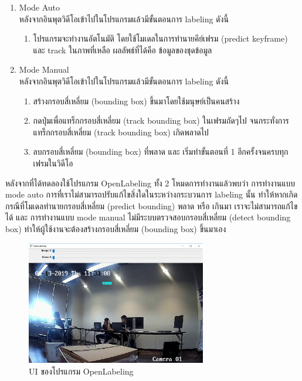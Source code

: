 \begin{enumerate}
	\setlength\itemsep{-0.25em}
	\item Mode Auto
	\\ หลังจากอินพุตวิดีโอเข้าไปในโปรแกรมแล้วมีขั้นตอนการ labeling ดังนี้ 
   	\begin{enumerate}
	\setlength\itemsep{-0.25em}
    		\item โปรแกรมจะทำงานอัตโนมัติ โดยใช้โมเดลในการทำนายคีย์เฟรม (predict keyframe)  และ track ในภาพที่เหลือ ผลลัพธ์ที่ได้คือ ข้อมูลของชุดข้อมูล
 	\end{enumerate}
	\item Mode Manual
	\\ หลังจากอินพุตวิดีโอเข้าไปในโปรแกรมแล้วมีขั้นตอนการ labeling ดังนี้ 
	\begin{enumerate}
	\setlength\itemsep{-0.25em}
    		\item สร้างกรอบสี่เหลี่ยม (bounding box) ขึ้นมาโดยใช้มนุษย์เป็นคนสร้าง
		\item กดปุ่มเพื่อแทร็กกรอบสี่เหลี่ยม (track bounding box) ในเฟรมถัดๆไป จนกระทั่งการแทร็กกรอบสี่เหลี่ยม (track bounding box) เกิดพลาดไป
		\item ลบกรอบสี่เหลี่ยม (bounding box) ที่พลาด และ เริ่มทำขั้นตอนที่ 1 อีกครั้งจนครบทุกเฟรมในวิดีโอ
 	\end{enumerate}
 \end{enumerate}
หลังจากที่ได้ทดลองใช้โปรแกรม OpenLabeling ทั้ง 2 โหมดการทำงานแล้วพบว่า การทำงานแบบ mode auto การที่เราไม่สามารถปรับแก้ไขสิ่งใดในระหว่างกระบวนการ labeling นั้น ทำให้หากเกิดกรณีที่โมเดลทำนายกรอบสี่เหลี่ยม (predict bounding) พลาด หรือ เกินมา เราจะไม่สามารถแก้ไขได้ และ การทำงานแบบ mode manual ไม่มีระบบตรวจสอบกรอบสี่เหลี่ยม (detect bounding box) ทำให้ผู้ใช้งานจะต้องสร้างกรอบสี่เหลี่ยม (bounding box) ขึ้นมาเอง

\begin{figure}[!ht]
	\centering
	\includegraphics[width=0.7\textwidth]{chapter2/images/openlabel.png}
		\caption{UI ของโปรแกรม OpenLabeling}
    	\label{fig:openlabel}
\end{figure}


